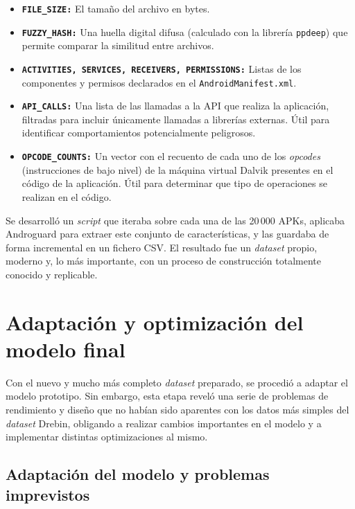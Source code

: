 \begin{itemize}
	\item \textbf{\texttt{FILE\_SIZE:}} El tamaño del archivo en bytes.
	
	\item \textbf{\texttt{FUZZY\_HASH:}} Una huella digital difusa (calculado con la librería \texttt{ppdeep}) que permite comparar la similitud entre archivos.
	
	\item \textbf{\texttt{ACTIVITIES, SERVICES, RECEIVERS, PERMISSIONS:}} Listas de los componentes y permisos declarados en el \texttt{AndroidManifest.xml}.
	
	\item \textbf{\texttt{API\_CALLS:}} Una lista de las llamadas a la API que realiza la aplicación, filtradas para incluir únicamente llamadas a librerías externas. Útil para identificar comportamientos potencialmente peligrosos.
	
	\item \textbf{\texttt{OPCODE\_COUNTS:}} Un vector con el recuento de cada uno de los \textit{opcodes} (instrucciones de bajo nivel) de la máquina virtual Dalvik presentes en el código de la aplicación. Útil para determinar que tipo de operaciones se realizan en el código.
\end{itemize}

Se desarrolló un \textit{script} que iteraba sobre cada una de las 20\,000 APKs, aplicaba Androguard para extraer este conjunto de características, y las guardaba de forma incremental en un fichero CSV. El resultado fue un \textit{dataset} propio, moderno y, lo más importante, con un proceso de construcción totalmente conocido y replicable.

\section{Adaptación y optimización del modelo final}

Con el nuevo y mucho más completo \textit{dataset} preparado, se procedió a adaptar el modelo prototipo. Sin embargo, esta etapa reveló una serie de problemas de rendimiento y diseño que no habían sido aparentes con los datos más simples del \textit{dataset} Drebin, obligando a realizar cambios importantes en el modelo y a implementar distintas optimizaciones al mismo.

\subsection{Adaptación del modelo y problemas imprevistos}

